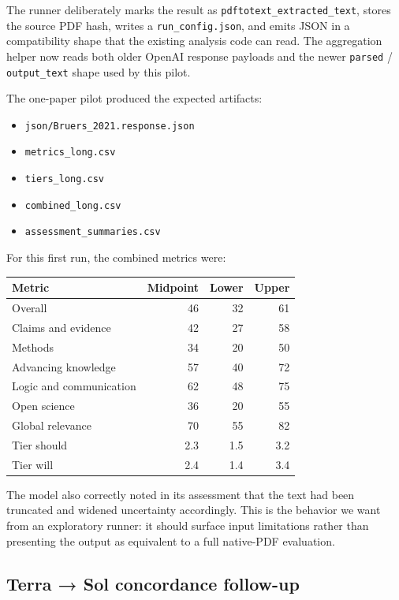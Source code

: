 \documentclass[
  11pt,
  letterpaper,
]{article}
\providecommand{\tightlist}{%
  \setlength{\itemsep}{0pt}\setlength{\parskip}{0pt}}
\begin{document}
The runner deliberately marks the result as
\texttt{pdftotext\_extracted\_text}, stores the source PDF hash, writes
a \texttt{run\_config.json}, and emits JSON in a compatibility shape
that the existing analysis code can read. The aggregation helper now
reads both older OpenAI response payloads and the newer \texttt{parsed}
/ \texttt{output\_text} shape used by this pilot.

The one-paper pilot produced the expected artifacts:

\begin{itemize}
\tightlist
\item
  \texttt{json/Bruers\_2021.response.json}
\item
  \texttt{metrics\_long.csv}
\item
  \texttt{tiers\_long.csv}
\item
  \texttt{combined\_long.csv}
\item
  \texttt{assessment\_summaries.csv}
\end{itemize}

For this first run, the combined metrics were:

\begin{longtable}[]{@{}lrrr@{}}
\toprule\noalign{}
Metric & Midpoint & Lower & Upper \\
\midrule\noalign{}
\endhead
\bottomrule\noalign{}
\endlastfoot
Overall & 46 & 32 & 61 \\
Claims and evidence & 42 & 27 & 58 \\
Methods & 34 & 20 & 50 \\
Advancing knowledge & 57 & 40 & 72 \\
Logic and communication & 62 & 48 & 75 \\
Open science & 36 & 20 & 55 \\
Global relevance & 70 & 55 & 82 \\
Tier should & 2.3 & 1.5 & 3.2 \\
Tier will & 2.4 & 1.4 & 3.4 \\
\end{longtable}

The model also correctly noted in its assessment that the text had been
truncated and widened uncertainty accordingly. This is the behavior we
want from an exploratory runner: it should surface input limitations
rather than presenting the output as equivalent to a full native-PDF
evaluation.

\subsection{Terra → Sol concordance
follow-up}\label{terra-sol-concordance-follow-up}
\end{document}
